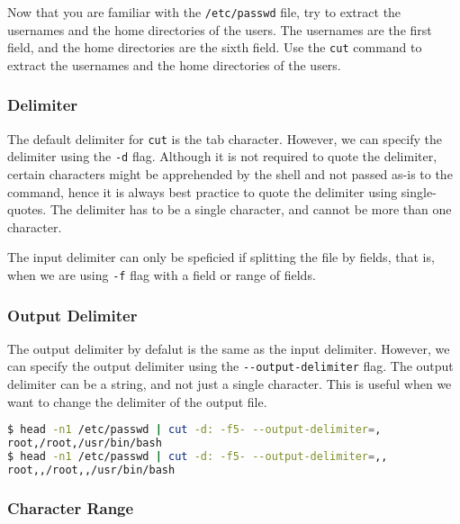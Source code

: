 \begin{exercise}
  Now that you are familiar with the \lstinline|/etc/passwd| file, try to extract the usernames and the home directories of the users. The usernames are the first field, and the home directories are the sixth field. Use the \lstinline|cut| command to extract the usernames and the home directories of the users.
\end{exercise}

\subsubsection{Delimiter}

The default delimiter for \lstinline|cut| is the tab character. However, we can specify the delimiter using the \lstinline|-d| flag. Although it is not required to quote the delimiter, certain characters might be apprehended by the shell and not passed as-is to the command, hence it is always best practice to quote the delimiter using single-quotes. The delimiter has to be a single character, and cannot be more than one character.

The input delimiter can only be speficied if splitting the file by fields, that is, when we are using \lstinline|-f| flag with a field or range of fields.

\subsubsection{Output Delimiter}

The output delimiter by defalut is the same as the input delimiter. However, we can specify the output delimiter using the \lstinline|--output-delimiter| flag. The output delimiter can be a string, and not just a single character. This is useful when we want to change the delimiter of the output file.

\begin{lstlisting}[language=bash]
$ head -n1 /etc/passwd | cut -d: -f5- --output-delimiter=,
root,/root,/usr/bin/bash
$ head -n1 /etc/passwd | cut -d: -f5- --output-delimiter=,,
root,,/root,,/usr/bin/bash
\end{lstlisting}

\subsubsection{Character Range}

